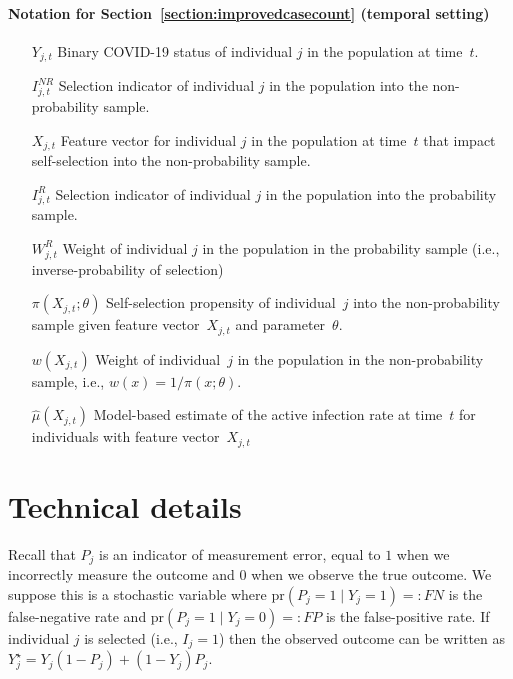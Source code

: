 \documentclass[11pt]{amsart}
\numberwithin{equation}{section}
\theoremstyle{plain}
\def\pr{\text{pr}}
\begin{document}
\paragraph{\bf Notation for Section~\ref{section:improvedcasecount} (temporal setting)}
\begin{itemize}
\item[$Y_{j,t}$] \quad Binary COVID-19 status of individual $j$ in the population at time~$t$.
\item[$I^{NR}_{j,t}$] \quad Selection indicator of individual $j$ in the population into the non-probability sample.
\item[$X_{j,t}$] \quad Feature vector for individual $j$ in the population at time~$t$ that impact self-selection into the non-probability sample.
\item[$I_{j,t}^{R}$] \quad Selection indicator of individual $j$ in the population into the probability sample.
\item[$W_{j,t}^{R}$] \quad Weight of individual $j$ in the population in the probability sample (i.e., inverse-probability of selection)
\item[$\pi (X_{j,t}; \theta)$] \quad Self-selection propensity of individual~$j$ into the non-probability sample given feature vector~$X_{j,t}$ and parameter~$\theta$.
\item[$w (X_{j,t})$] \quad Weight of individual~$j$ in the population in the non-probability sample, i.e., $w(x) = 1/\pi(x; \theta)$.
\item[$\hat \mu(X_{j,t})$] \quad Model-based estimate of the active infection rate at time~$t$ for individuals with feature vector~$X_{j,t}$
\end{itemize}

\section{Technical details}

Recall that $P_j$ is  an indicator of measurement error, equal to $1$ when we incorrectly measure the outcome and $0$ when we observe the true outcome. We suppose this is a stochastic variable where $\pr(P_j = 1 \mid Y_j = 1) =: FN$ is the false-negative rate and $\pr(P_j = 1 \mid Y_j = 0) =: FP$ is the false-positive rate.  If individual $j$ is selected (i.e., $I_j = 1$) then the observed outcome can be written as $Y_j^{\star} = Y_j(1-P_j) + (1-Y_j) P_j$.
\end{document}
